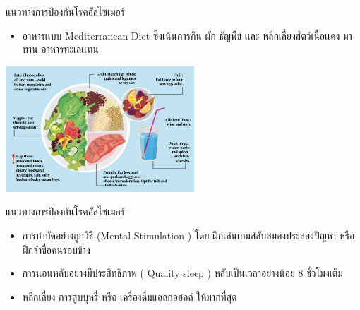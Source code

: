 \documentclass[xetex,serif]{beamer}
\begin{document}
\begin{frame}{แนวทางการป้องกันโรคอัลไซเมอร์}
  \begin{itemize}
    \item อาหารเเบบ Mediterranean Diet ซึ่งเน้นการกิน ผัก ธัญพืช เเละ หลีกเลี่ยงสัตว์เนื้อเเดง มาทาน อาหารทะเลเเทน
  \end{itemize}
  \begin{center}
    \includegraphics[width=200pt]{file1.png}
  \end{center}

\end{frame}

\begin{frame}{แนวทางการป้องกันโรคอัลไซเมอร์}
  \begin{itemize}
    \item การบำบัดอย่างถูกวิธี (Mental Stimulation ) โดย ฝึกเล่นเกมส์ลับสมองประลองปัญหา หรือ ฝึกจําชื่อคนรอบข้าง
    \item การนอนหลับอย่างมีประสิทธิภาพ ( Quality sleep ) หลับเป็นเวลาอย่างน้อย 8 ชั่วโมงเต็ม
    \item หลีกเลี่ยง การสูบบุหรี่ หรือ เครื่องดื่มแอลกอฮอล์ ให้มากที่สุด
  \end{itemize}
\end{frame}
\end{document}
